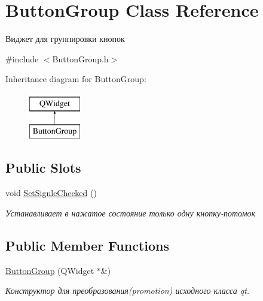 \hypertarget{class_button_group}{}\section{Button\+Group Class Reference}
\label{class_button_group}


Виджет для группировки кнопок  




{\ttfamily \#include $<$Button\+Group.\+h$>$}

Inheritance diagram for Button\+Group\+:\begin{figure}[H]
\begin{center}
\leavevmode
\includegraphics[height=2.000000cm]{class_button_group}
\end{center}
\end{figure}
\subsection*{Public Slots}
\begin{DoxyCompactItemize}
\item 
\mbox{\label{class_button_group_a6e3b11b69baf3b3f0ee1584ba2da4a8b}} 
void \hyperlink{class_button_group_a6e3b11b69baf3b3f0ee1584ba2da4a8b}{Set\+Signle\+Checked} ()
\begin{DoxyCompactList}\small\item\em Устанавливает в нажатое состояние только одну кнопку-\/потомок \end{DoxyCompactList}\end{DoxyCompactItemize}
\subsection*{Public Member Functions}
\begin{DoxyCompactItemize}
\item 
\hyperlink{class_button_group_a849b8949696a16eb6b17cc630f860e8e}{Button\+Group} (Q\+Widget $\ast$\&)
\begin{DoxyCompactList}\small\item\em Конструктор для преобразования(promotion) исходного класса qt. \end{DoxyCompactList}\end{DoxyCompactItemize}


